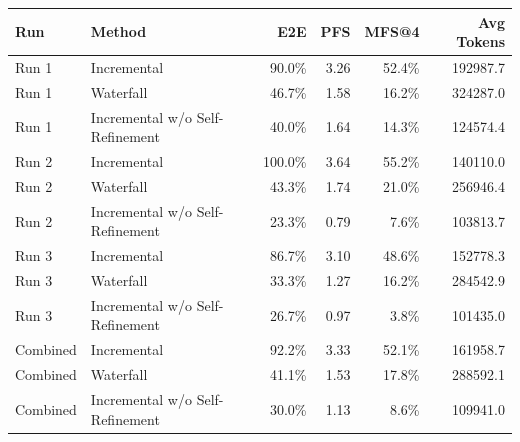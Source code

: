 \begin{tabular}{llrrrr}
\toprule
Run & Method & E2E & PFS & MFS@4 & Avg Tokens \\
\midrule
Run 1 & Incremental & 90.0\% & 3.26 & 52.4\% & 192987.7 \\
Run 1 & Waterfall & 46.7\% & 1.58 & 16.2\% & 324287.0 \\
Run 1 & Incremental w/o Self-Refinement & 40.0\% & 1.64 & 14.3\% & 124574.4 \\
Run 2 & Incremental & 100.0\% & 3.64 & 55.2\% & 140110.0 \\
Run 2 & Waterfall & 43.3\% & 1.74 & 21.0\% & 256946.4 \\
Run 2 & Incremental w/o Self-Refinement & 23.3\% & 0.79 & 7.6\% & 103813.7 \\
Run 3 & Incremental & 86.7\% & 3.10 & 48.6\% & 152778.3 \\
Run 3 & Waterfall & 33.3\% & 1.27 & 16.2\% & 284542.9 \\
Run 3 & Incremental w/o Self-Refinement & 26.7\% & 0.97 & 3.8\% & 101435.0 \\
Combined & Incremental & 92.2\% & 3.33 & 52.1\% & 161958.7 \\
Combined & Waterfall & 41.1\% & 1.53 & 17.8\% & 288592.1 \\
Combined & Incremental w/o Self-Refinement & 30.0\% & 1.13 & 8.6\% & 109941.0 \\
\bottomrule
\end{tabular}
